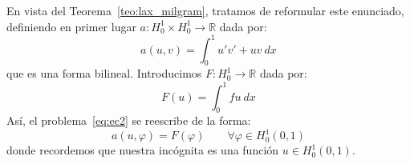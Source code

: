 \begin{ejemplo}
    \noindent
    En vista del Teorema~\ref{teo:lax_milgram}, tratamos de reformular este enunciado, definiendo en primer lugar $a:H_0^1\times H_0^1\to \mathbb{R}$ dada por:
    \begin{equation*}
        a(u,v) = \int_{0}^{1} u'v'+uv~dx 
    \end{equation*}
    que es una forma bilineal. Introducimos $F:H_0^1\to \mathbb{R}$ dada por:
    \begin{equation*}
        F(u) = \int_{0}^{1} fu~dx 
    \end{equation*}
    Así, el problema~\eqref{eq:ec2} se reescribe de la forma:
    \begin{equation*}
        a(u,\varphi) = F(\varphi) \qquad \forall \varphi \in H_0^1(0,1)
    \end{equation*}
    donde recordemos que nuestra incógnita es una función $u\in H_0^1(0,1)$.\\


\end{ejemplo}
